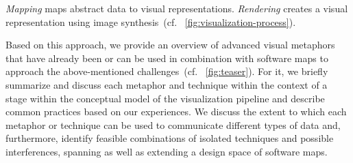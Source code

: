 \documentclass[sigconf]{acmart}
\def\cf{cf. }
\begin{document}
\emph{Mapping} maps abstract data to visual representations.
\emph{Rendering} creates a visual representation using image synthesis~(\cf~\autoref{fig:visualization-process}).
\par
Based on this approach, we provide an overview of advanced visual metaphors that have already been or can be used in combination with software maps to approach the above-mentioned challenges~(\cf~\autoref{fig:teaser}).
For it, we briefly summarize and discuss each metaphor and technique within the context of a stage within the conceptual model of the visualization pipeline and describe common practices based on our experiences.
We discuss the extent to which each metaphor or technique can be used to communicate different types of data and, furthermore, identify feasible combinations of isolated techniques and possible interferences, spanning as well as extending a design space of software maps.
\end{document}
